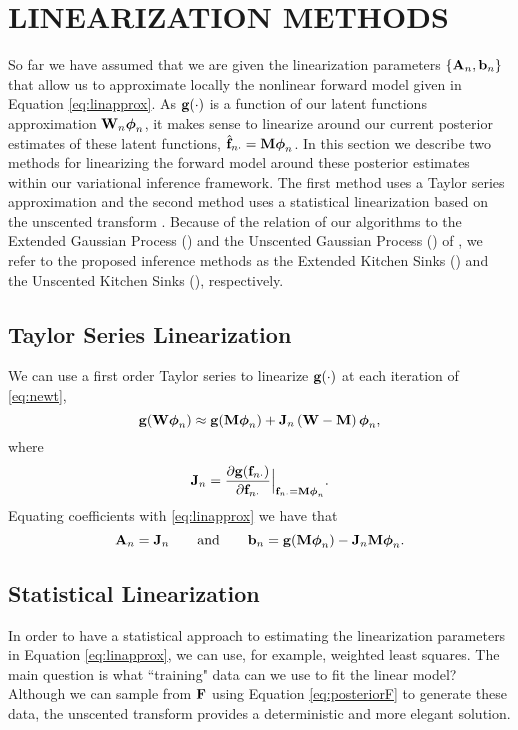 \section{LINEARIZATION METHODS}
So far we have assumed that we are given the linearization parameters $\{\mathbf{A}_n, \mathbf{b}_n\}$ that allow us to 
approximate locally the nonlinear forward model given in Equation   \eqref{eq:linapprox}. As 
$\mathbf{g}\!\left({{\cdot}}\right)$  is a function of our latent functions approximation ${\mathbf{W}_n\boldsymbol\phi_n}$,  
it makes sense to linearize around our current posterior estimates of these latent functions, 
$\hat{\mathbf{f}}_{n \cdot} =\mathbf{M} \boldsymbol\phi_n$. In this section we describe two methods for linearizing 
the  forward model around these posterior estimates within our variational 
inference framework. The first method uses a Taylor series approximation and the second 
method uses a statistical linearization \citep{Geist2010} based on the unscented transform \citep{Julier2004}. 
Because of the relation of our algorithms to the Extended Gaussian Process (\egp) and 
the  Unscented Gaussian Process (\ugp) of \citet{steinberg-bonilla-nips-2014},   we refer to 
the proposed inference methods as  the Extended Kitchen Sinks (\eks) and the 
Unscented Kitchen Sinks (\uks), respectively.
%
\subsection{Taylor Series Linearization}
We can use a first order Taylor series to linearize $\mathbf{g}\!\left({{\cdot}}\right)$ at each
iteration of \eqref{eq:newt},
\begin{equation}
    \mathbf{g}\!\left({{\mathbf{W}\boldsymbol\phi_n}}\right) \approx \mathbf{g}\!\left({{\mathbf{M}\boldsymbol\phi_n}}\right) +
    \mathbf{J}_{n}\left({\mathbf{W} - \mathbf{M}}\right)\boldsymbol\phi_n,
\end{equation}
where 
\begin{equation}
\mathbf{J}_{n} = \frac{ \partial\mathbf{g}\!\left({{\mathbf{f}_{n \cdot}}}\right) } {  \partial \mathbf{f}_{n \cdot} }  \Big|_{\mathbf{f}_{n \cdot} = \mathbf{M} \boldsymbol\phi_n } \text{.}
\end{equation}
Equating coefficients with \eqref{eq:linapprox} we have that
\begin{equation}
    \mathbf{A}_n = \mathbf{J}_{n} \qquad \text{and} \qquad \mathbf{b}_n = 
        \mathbf{g}\!\left({{\mathbf{M}\boldsymbol\phi_n}}\right) - \mathbf{J}_{n}\mathbf{M}\boldsymbol\phi_n.
\end{equation}
%
\subsection{Statistical Linearization}
In order to have a  statistical approach to estimating the linearization parameters 
 in  Equation \eqref{eq:linapprox}, we can  use, for example, weighted least squares.  The main question 
is what ``training" data  can we use to fit the linear model? Although we can 
sample from $\mathbf{F}$ using Equation \eqref{eq:posteriorF} to generate these data, 
the unscented transform  \citep[\ut;][]{Julier2004} provides a deterministic and more elegant solution. 

